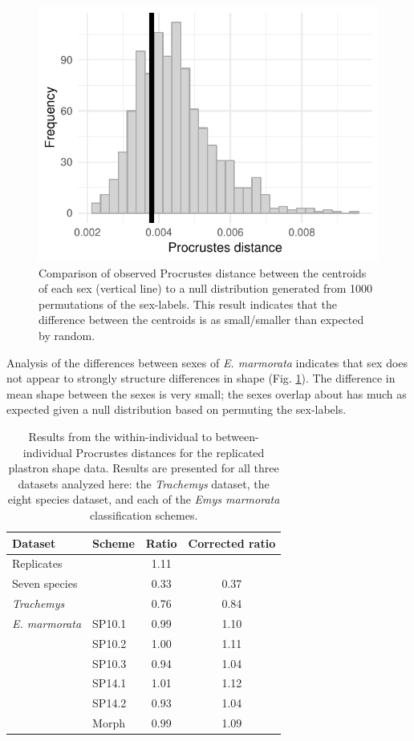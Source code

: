 \documentclass[fleqn,10pt,lineno]{wlpeerj} %
\begin{document}
\begin{figure}[h]
  \centering
  \includegraphics[height = 0.3\textheight, width = \textwidth, keepaspectratio = true]{figure/sex_test_hist}
  \caption{Comparison of observed Procrustes distance between the centroids of each sex (vertical line) to a null distribution generated from 1000 permutations of the sex-labels. This result indicates that the difference between the centroids is as small/smaller than expected by random.}
  \label{fig:sex_test}
\end{figure}

Analysis of the differences between sexes of \textit{E. marmorata} indicates that sex does not appear to strongly structure differences in shape (Fig. \ref{fig:sex_test}). The difference in mean shape between the sexes is very small; the sexes overlap about has much as expected given a null distribution based on permuting the sex-labels.

\begin{table}
  \centering
  \caption{Results from the within-individual to between-individual Procrustes distances for the replicated plastron shape data. Results are presented for all three datasets analyzed here: the \textit{Trachemys} dataset, the eight species dataset, and each of the \textit{Emys marmorata} classification schemes.}
  \begin{tabular}{l l c c}
    \textbf{Dataset} & \textbf{Scheme} & \textbf{Ratio} & \textbf{Corrected ratio} \\
    \hline
    Replicates & & 1.11 & \\
    \hline
    Seven species & & 0.33 & 0.37 \\
    \textit{Trachemys} & & 0.76 & 0.84 \\
    \hline
    \textit{E. marmorata} & SP10.1 & 0.99 & 1.10 \\
     & SP10.2 & 1.00 & 1.11 \\
     & SP10.3 & 0.94 & 1.04 \\
     & SP14.1 & 1.01 & 1.12 \\
     & SP14.2 & 0.93 & 1.04 \\
     & Morph & 0.99 & 1.09 \\
    \hline
  \end{tabular}
  \label{tab:rep_res}
\end{table}
\end{document}
